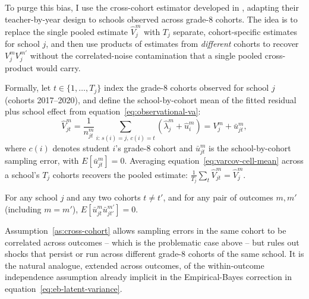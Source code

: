 \documentclass[a4paper, article, english, oneside, unknownkeysallowed, 12pt]{memoir}
\begin{document}
To purge this bias, I use the cross-cohort estimator developed in \textcite{rose_effects_2022}, adapting their teacher-by-year design to schools observed across grade-8 cohorts.
The idea is to replace the single pooled estimate $\widehat V_j^m$ with $T_j$ separate, cohort-specific estimates for school $j$, and then use products of estimates from \emph{different} cohorts to recover $V_j^m V_j^{m'}$ without the correlated-noise contamination that a single pooled cross-product would carry.

Formally, let $t \in \{1,\ldots,T_j\}$ index the grade-8 cohorts observed for school $j$ (cohorts 2017--2020), and define the school-by-cohort mean of the fitted residual plus school effect from equation~\eqref{eq:observational-va}:
\begin{equation}
  \widehat V_{jt}^m = \frac{1}{n_{jt}^m}\sum_{i:\, s(i)=j,\, c(i)=t} \left(\widehat\lambda_j^m + \widehat u_i^m\right) = V_j^m + \bar u_{jt}^m,
  \label{eq:varcov-cell-mean}
\end{equation}
where $c(i)$ denotes student $i$'s grade-8 cohort and $\bar u_{jt}^m$ is the school-by-cohort sampling error, with $E[\bar u_{jt}^m]=0$.
Averaging equation~\eqref{eq:varcov-cell-mean} across a school's $T_j$ cohorts recovers the pooled estimate: $\frac{1}{T_j}\sum_t \widehat V_{jt}^m = \widehat V_j^m$.

\begin{assumption}
  For any school $j$ and any two cohorts $t\neq t'$, and for any pair of outcomes $m, m'$ (including $m=m'$),
  $E\left[\bar u_{jt}^m \bar u_{jt'}^{m'}\right]=0$.
  \label{as:cross-cohort}
\end{assumption}

Assumption~\ref{as:cross-cohort} allows sampling errors in the same cohort to be correlated across outcomes -- which is the problematic case above -- but rules out shocks that persist or run across different grade-8 cohorts of the same school.
It is the natural analogue, extended across outcomes, of the within-outcome independence assumption already implicit in the Empirical-Bayes correction in equation~\eqref{eq:eb-latent-variance}.
\end{document}
